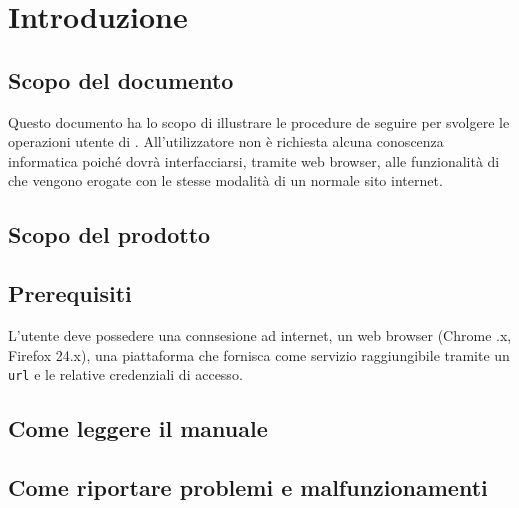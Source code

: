 \section{Introduzione}


\subsection{Scopo del documento}
Questo documento ha lo scopo di illustrare le procedure de seguire per svolgere le operazioni utente di . All'utilizzatore non è richiesta alcuna conoscenza informatica poiché dovrà interfacciarsi, tramite web browser, alle funzionalità di  che vengono erogate con le stesse modalità di un normale sito internet.

\subsection{Scopo del prodotto}
\ScopoDelProdotto 

\subsection{Prerequisiti}
L'utente deve possedere una connsesione ad internet, un web browser (Chrome .x, Firefox \geq 24.x), una piattaforma che fornisca  come servizio raggiungibile tramite un \texttt{url} e le relative credenziali di accesso.

\subsection{Come leggere il manuale}

\subsection{Come riportare problemi e malfunzionamenti}






